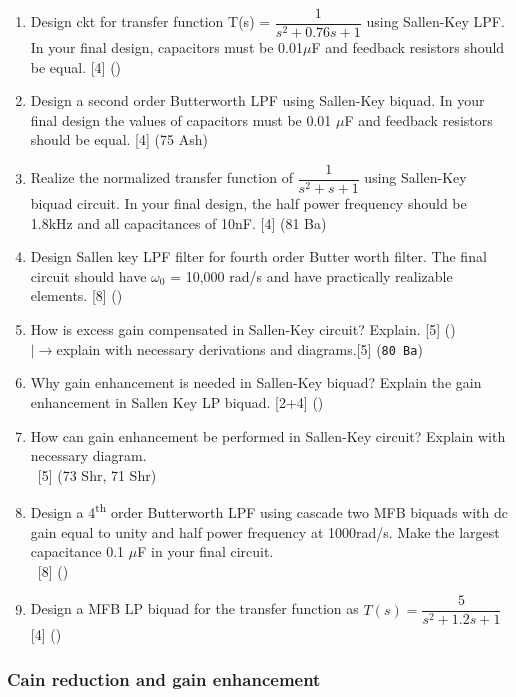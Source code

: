 \documentclass[12pt]{article}
\newcommand{\w}{\(\omega\)}
\newcommand{\lb}{\\$\left|\rightarrow\right.$}
\newcommand{\enter}{\\\textcolor{white}{1}}
\newcommand{\super}[1]{\textsuperscript{#1}}
\begin{document}
\begin{enumerate}
				\item Design ckt for transfer function T(s) = $\dfrac{1}{s^2+0.76s+1}$ using Sallen-Key LPF. In your final design, capacitors must be 0.01$\mu$F and feedback resistors should be equal. \hfill [4] ()

				\item Design a second order Butterworth LPF using Sallen-Key biquad. In your final design the values of capacitors must be 0.01 $\mu$F and feedback resistors should be equal. \hfill [4] (75 Ash)

				\item Realize the normalized transfer function of $\dfrac{1}{s^2+s+1}$ using Sallen-Key biquad circuit. In your final design, the half power frequency should be 1.8kHz and all capacitances of 10nF. \hfill [4] (81 Ba)

				\item Design Sallen key LPF filter for fourth order Butter worth filter. The final circuit should have \w$_0$ = 10,000 rad/s and have practically realizable elements. \hfill [8] ()

				\item How is excess gain compensated in Sallen-Key circuit? Explain. \hfill [5] ()
				\lb explain with necessary derivations and diagrams.\hfill [5] (\texttt{80 Ba})
				
				\item Why gain enhancement is needed in Sallen-Key biquad? Explain the gain enhancement in Sallen Key LP biquad. \hfill [2+4] ()

				\item How can gain enhancement be performed in Sallen-Key circuit? Explain with necessary diagram.
				\enter\hfill [5] (73 Shr, 71 Shr)

				\item Design a 4\super{th} order Butterworth LPF using cascade two MFB biquads with dc gain equal to unity and half power frequency at 1000rad/s. Make the largest capacitance 0.1 $\mu$F in your final circuit.
				\enter\hfill [8] ()
				
				\item Design a MFB LP biquad for the transfer function as $T(s) = \dfrac{5}{s^2+1.2s+1}$ \hfill [4] ()
			\end{enumerate}

		\subsubsection{Cain reduction and gain enhancement}
\end{document}

